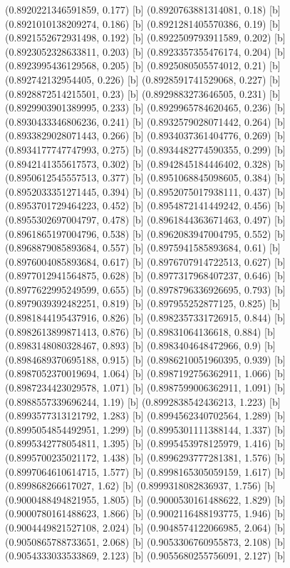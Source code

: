 {{{(0.8920221346591859, 0.177) [b] 
(0.8920763881314081, 0.18) [b] 
(0.8921010138209274, 0.186) [b] 
(0.8921281405570386, 0.19) [b] 
(0.8921552672931498, 0.192) [b] 
(0.8922509793911589, 0.202) [b] 
(0.8923052328633811, 0.203) [b] 
(0.8923357355476174, 0.204) [b] 
(0.8923995436129568, 0.205) [b] 
(0.8925080505574012, 0.21) [b] 
(0.892742132954405, 0.226) [b] 
(0.8928591741529068, 0.227) [b] 
(0.8928872514215501, 0.23) [b] 
(0.8929883273646505, 0.231) [b] 
(0.8929903901389995, 0.233) [b] 
(0.8929965784620465, 0.236) [b] 
(0.8930433346806236, 0.241) [b] 
(0.8932579028071442, 0.264) [b] 
(0.8933829028071443, 0.266) [b] 
(0.8934037361404776, 0.269) [b] 
(0.8934177747747993, 0.275) [b] 
(0.8934482774590355, 0.299) [b] 
(0.8942141355617573, 0.302) [b] 
(0.8942845184446402, 0.328) [b] 
(0.8950612545557513, 0.377) [b] 
(0.8951068845098605, 0.384) [b] 
(0.8952033351271445, 0.394) [b] 
(0.8952075017938111, 0.437) [b] 
(0.8953701729464223, 0.452) [b] 
(0.8954872141449242, 0.456) [b] 
(0.8955302697004797, 0.478) [b] 
(0.8961844363671463, 0.497) [b] 
(0.8961865197004796, 0.538) [b] 
(0.8962083947004795, 0.552) [b] 
(0.8968879085893684, 0.557) [b] 
(0.8975941585893684, 0.61) [b] 
(0.8976004085893684, 0.617) [b] 
(0.8976707914722513, 0.627) [b] 
(0.8977012941564875, 0.628) [b] 
(0.8977317968407237, 0.646) [b] 
(0.8977622995249599, 0.655) [b] 
(0.8978796336926695, 0.793) [b] 
(0.8979039392482251, 0.819) [b] 
(0.897955252877125, 0.825) [b] 
(0.8981844195437916, 0.826) [b] 
(0.8982357331726915, 0.844) [b] 
(0.8982613899871413, 0.876) [b] 
(0.89831064136618, 0.884) [b] 
(0.8983148080328467, 0.893) [b] 
(0.8983404648472966, 0.9) [b] 
(0.8984689370695188, 0.915) [b] 
(0.8986210051960395, 0.939) [b] 
(0.8987052370019694, 1.064) [b] 
(0.8987192756362911, 1.066) [b] 
(0.8987234423029578, 1.071) [b] 
(0.8987599006362911, 1.091) [b] 
(0.8988557339696244, 1.19) [b] 
(0.8992838542436213, 1.223) [b] 
(0.8993577313121792, 1.283) [b] 
(0.8994562340702564, 1.289) [b] 
(0.8995054854492951, 1.299) [b] 
(0.8995301111388144, 1.337) [b] 
(0.8995342778054811, 1.395) [b] 
(0.8995453978125979, 1.416) [b] 
(0.8995700235021172, 1.438) [b] 
(0.8996293777281381, 1.576) [b] 
(0.8997064610614715, 1.577) [b] 
(0.8998165305059159, 1.617) [b] 
(0.899868266617027, 1.62) [b] 
(0.8999318082836937, 1.756) [b] 
(0.9000488494821955, 1.805) [b] 
(0.9000530161488622, 1.829) [b] 
(0.9000780161488623, 1.866) [b] 
(0.9002116488193775, 1.946) [b] 
(0.9004449821527108, 2.024) [b] 
(0.9048574122066985, 2.064) [b] 
(0.9050865788733651, 2.068) [b] 
(0.9053306760955873, 2.108) [b] 
(0.9054333033533869, 2.123) [b] 
(0.9055680255756091, 2.127) [b] 
}}}
